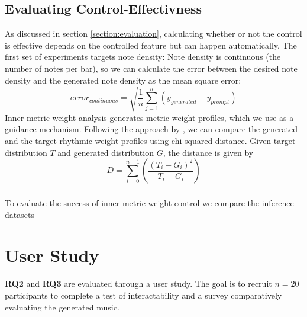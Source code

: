 \subsection{Evaluating Control-Effectivness}
As discussed in section \ref{section:evaluation}, calculating whether or not the control is effective depends on the controlled feature but can happen automatically. 
The first set of experiments targets note density: 
Note density is continuous (the number of notes per bar), so we can calculate the error between the desired note density and the generated note density as the mean square error: 
\begin{equation}
 error_{continuous} = \sqrt{\frac{1}{n}\sum_{j=1}^{n}(y_{generated}-y_{prompt})}
\end{equation}
Inner metric weight analysis generates metric weight profiles, which we use as a guidance mechanism. Following the approach by \cite{Bemman2024}, we can compare the generated and the target rhythmic weight profiles using chi-squared distance.
Given target distribution $T$ and generated distribution $G$, the distance is given by 
\begin{equation}
D=\sum_{i=0}^{n-1}(\frac{(T_i-G_i)^2}{T_i+G_i})
\end{equation}
\subsubsection{}
To evaluate the success of inner metric weight control we compare the inference datasets 
\section{User Study}
\textbf{RQ2} and \textbf{RQ3} are evaluated through a user study. The goal is to recruit $n=20$ participants to complete a test of interactability and a survey comparatively evaluating the generated music. 
